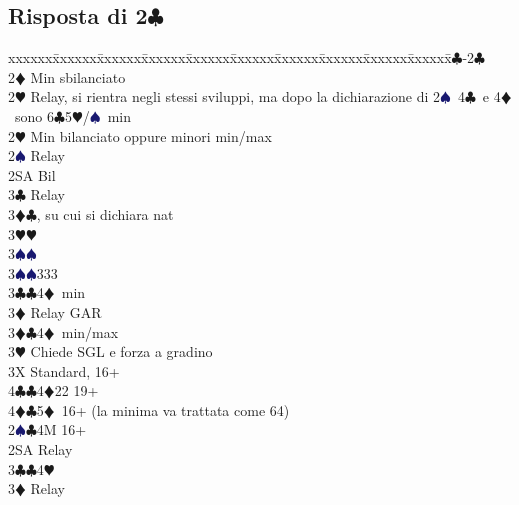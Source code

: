 \documentclass[a4paper,italian]{article}
\newcommand{\BC}{\textcolor{OliveGreen}{$\clubsuit$}}
\newcommand{\BD}{\textcolor{RedOrange}{$\vardiamondsuit$}}
\newcommand{\BH}{\textcolor{Red2}{$\varheartsuit${}}}
\newcommand{\BS}{\textcolor{MidnightBlue}{$\spadesuit${}}}
\newcommand{\pdfc}{\texorpdfstring{\BC{}}{C}}
\newenvironment{bidtable}
{\begin{tabbing}

    xxxxxx\=xxxxxx\=xxxxxx\=xxxxxx\=xxxxxx\=xxxxxx\=xxxxxx\=xxxxxx\=xxxxxx\=xxxxxx\=\kill}
{\end{tabbing} }%
\begin{document}
                                \subsection{Risposta di 2\pdfc}
                                \begin{bidtable}
                                    1\BC-2\BC\+\\
                                    2\BD \> Min sbilanciato\+\\
                                    2\BH \> Relay, si rientra negli stessi sviluppi, ma dopo la dichiarazione di 2\BS\ 4\BC\ e 4\BD\ sono 6\BC 5\BH /\BS\ min\-\\
                                    2\BH \> Min bilanciato oppure minori min/max\+\\
                                    2\BS \> Relay\+\\
                                    2SA \> Bil\+\\
                                    3\BC \> Relay\+\\
                                    3\BD {}\BC , su cui si dichiara nat\\
                                    3\BH {}\BH \+\\
                                    3\BS {}\BS \-\\
                                    3\BS {}\BS 333\-\-\\
                                    3\BC {}\BC 4\BD\ min\+\\
                                    3\BD \> Relay GAR\-\\
                                    3\BD {}\BC 4\BD\ min/max\+\\
                                    3\BH \> Chiede SGL e forza a gradino\-\\
                                    3X \> Standard, 16+\\
                                    4\BC {}\BC 4\BD 22 19+\\
                                    4\BD {}\BC 5\BD\ 16+ (la minima va trattata come 64)\-\-\\
                                    2\BS {}\BC 4M 16+\+\\
                                    2SA \> Relay\+\\
                                    3\BC {}\BC 4\BH \+\\
                                    3\BD \> Relay\+\\

\end{bidtable}
\end{document}
